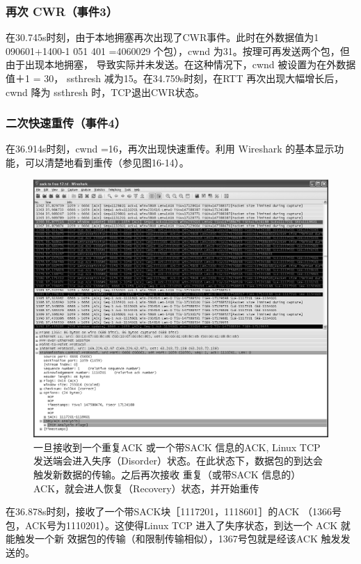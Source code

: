 \subsubsection{再次 CWR（事件3）}
在30.745s时刻，由于本地拥塞再次出现了CWR事件。此时在外数据值为1 090601+1400-1 051 401 =4060029 个包），cwnd 为31。按理可再发送两个包，但由于出现本地拥塞，
导致实际并未发送。在这种情况下，cwnd 被设置为在外数据值＋1 = 30， ssthresh 减为15。在34.759s时刻，在RTT 再次出现大幅增长后，cwnd 降为 ssthresh 时，TCP退出CWR状态。

\subsubsection{二次快速重传（事件4）}
在36.914s时刻，cwnd =16，再次出现快速重传。利用 Wireshark 的基本显示功能，可以清楚地看到重传（参见图16-14）。
\begin{figure}[!htb]
    \centering
	\includegraphics[width=1\textwidth]{imgs/16/16-14.png}
	\caption{一旦接收到一个重复ACK 或一个带SACK 信息的ACK, Linux TCP 发送端会进入失序（Disorder）状态。在此状态下，数据包的到达会触发新数据的传输。之后再次接收
    重复（或带SACK 信息的）ACK，就会进人恢复（Recovery）状态，并开始重传}
\end{figure}
在36.878s时刻，接收了一个带SACK块［1117201，1118601］的ACK （1366号包，ACK号为1110201）。这使得Linux TCP 进入了失序状态，到达一个 ACK 就能触发一个新
效据包的传输（和限制传输相似），1367号包就是经该ACK 触发发送的。

